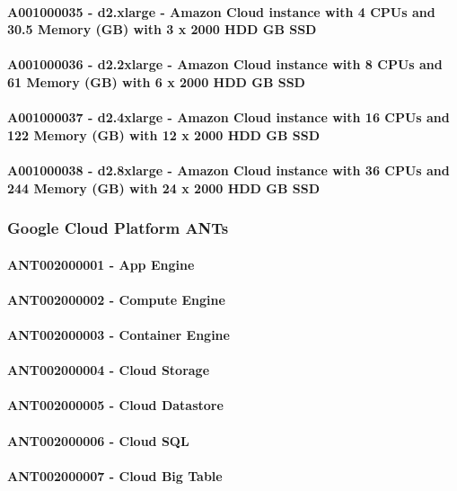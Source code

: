 \documentclass{acm_proc_article-sp}
\begin{document}
\paragraph{A001000035 - d2.xlarge - Amazon Cloud instance with 4 CPUs and 30.5 Memory (GB) with 3 x 2000 HDD GB SSD}
\paragraph{A001000036 - d2.2xlarge - Amazon Cloud instance with 8 CPUs and 61 Memory (GB) with 6 x 2000 HDD GB SSD}
\paragraph{A001000037 - d2.4xlarge - Amazon Cloud instance with 16 CPUs and 122 Memory (GB) with 12 x 2000 HDD GB SSD}
\paragraph{A001000038 - d2.8xlarge - Amazon Cloud instance with 36 CPUs and 244 Memory (GB) with 24 x 2000 HDD GB SSD}
\subsubsection{Google Cloud Platform ANTs}
\paragraph{ANT002000001 - App Engine}
\paragraph{ANT002000002 - Compute Engine}
\paragraph{ANT002000003 - Container Engine}
\paragraph{ANT002000004 - Cloud Storage}
\paragraph{ANT002000005 - Cloud Datastore}
\paragraph{ANT002000006 - Cloud SQL}
\paragraph{ANT002000007 - Cloud Big Table}
\end{document}
